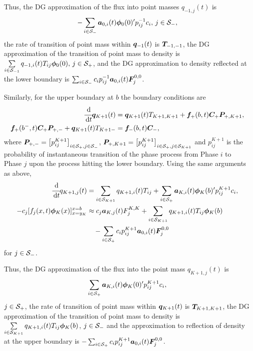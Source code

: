 Thus, the DG approximation of the flux into point masses \(q_{{-1},j}(t)\) is \[-\sum_{i\in\mathcal{S}_-}\boldsymbol a_{0,i}(t)\boldsymbol \phi_0(0)'{} p_{ij}^{-1} c_i,\,j\in\mathcal{S}_-,\] the rate of transition of point mass within \(\boldsymbol q_{{-1}}(t)\) is \(\boldsymbol T_{{-1},{-1}}\), the DG approximation of the transition of point mass to density is \(\sum\limits_{i\in\mathcal{S}_{-1}}q_{{-1},i}(t)T_{ij}\boldsymbol\phi_0(0),\,j\in\mathcal{S}_+\), and the DG approximation to density reflected at the lower boundary is \(\sum_{i\in\mathcal{S}_-}c_ip_{ij}^{-1}\boldsymbol a_{0,i}(t)\boldsymbol F_j^{0,0}\). 

Similarly, for the upper boundary at \(b\) the boundary conditions are 
\begin{align*}
\cfrac{\, \mathrm{d}}{\, \mathrm{d} t}\boldsymbol q_{K+1}(t) &= \boldsymbol q_{K+1}(t) T_{{K+1}, {K+1}} + \boldsymbol f_+(b,t)\boldsymbol C_+\boldsymbol P_{+,{K+1}},\\
\boldsymbol f_+(b^-,t)\boldsymbol C_+\boldsymbol P_{+,-} + \boldsymbol q_{K+1}(t)T_{{K+1}-}&=\boldsymbol f_-(b,t)\boldsymbol C_-,
\end{align*}
where \(\boldsymbol P_{+,-} = \left[p_{ij}^{K+1}\right]_{i\in\mathcal{S}_+,j\in\mathcal{S}_{-}}\), \(\boldsymbol P_{+,K+1} = \left[p_{ij}^{K+1}\right]_{i\in\mathcal{S}_+,j\in\mathcal{S}_{K+1}}\) and \(p_{ij}^{K+1}\) is the probability of instantaneous transition of the phase process from Phase \(i\) to Phase \(j\) upon the process hitting the lower boundary. Using the same arguments as above, 
\begin{align*}
\cfrac{\, \mathrm{d}}{\, \mathrm{d} t} q_{{K+1},j}(t) &= \sum_{i\in\mathcal{S}_{K+1}}q_{{K+1},i}(t) T_{ij} + \sum_{i\in\mathcal{S}_+}\boldsymbol a_{K,i}(t)\boldsymbol \phi_K(b)'{}p_{ij}^{K+1} c_i,
\\-c_j[f_j(x,t)\boldsymbol\phi_K(x)]_{x=y_K}^{x=b} & \approx c_j\boldsymbol a_{K,j}(t)F_j^{K,K}+\sum_{i\in\mathcal{S}_{K+1}}q_{{K+1},i}(t)T_{ij}\boldsymbol\phi_K(b) 
\\&\quad{} - \sum_{i\in\mathcal{S}_+}c_ip_{ij}^{K+1}\boldsymbol a_{0,i}(t)\boldsymbol F_j^{0,0}
\end{align*}
for \(j\in\mathcal{S}_-\). 

Thus, the DG approximation of the flux into the point mass \(q_{{K+1},j}(t)\) is 
\[\sum_{i\in\mathcal{S}_+}\boldsymbol a_{K,i}(t)\boldsymbol \phi_K(0)'{} p_{ij}^{K+1} c_i,\]
\(j\in\mathcal{S}_+\), the rate of transition of point mass within \(\boldsymbol q_{{K+1}}(t)\) is \(\boldsymbol T_{{K+1},{K+1}}\), the DG approximation of the transition of point mass to density is \(\sum\limits_{i\in\mathcal{S}_{K+1}}q_{{K+1},i}(t)T_{ij}\boldsymbol\phi_K(b)\), \(j\in\mathcal{S}_-\) and the approximation to reflection of density at the upper boundary is \(- \sum_{i\in\mathcal{S}_+}c_ip_{ij}^{K+1}\boldsymbol a_{0,i}(t)\boldsymbol F_j^{0,0}\). 

